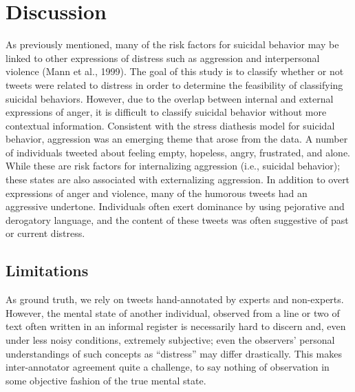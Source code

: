 \documentclass[11pt]{article}
\begin{document}

\section{Discussion}

As previously mentioned, many of the risk factors for suicidal behavior may be linked to other expressions of distress such as aggression and interpersonal violence (Mann et al., 1999).  The goal of this study is to classify whether or not tweets were related to distress in order to determine the feasibility of classifying suicidal behaviors.  However, due to the overlap between internal and external expressions of anger, it is difficult to classify suicidal behavior without more contextual information.  Consistent with the stress diathesis model for suicidal behavior, aggression was an emerging theme that arose from the data. A number of individuals tweeted about feeling empty, hopeless, angry, frustrated, and alone.  While these are risk factors for internalizing aggression (i.e., suicidal behavior); these states are also associated with externalizing aggression.  In addition to overt expressions of anger and violence, many of the humorous tweets had an aggressive undertone.  Individuals often exert dominance by using pejorative and derogatory language, and the content of these tweets was often suggestive of past or current distress.  


\subsection{Limitations}
As ground truth, we rely on tweets hand-annotated by experts and non-experts. However, the mental state of another individual, observed from a line or two of text  often written in an informal register is necessarily hard to discern and, even under less noisy conditions, extremely subjective; even the observers' personal understandings of such concepts as ``distress'' may differ drastically. This makes inter-annotator agreement quite a challenge, to say nothing of observation in some objective fashion of the true mental state.
\end{document}
